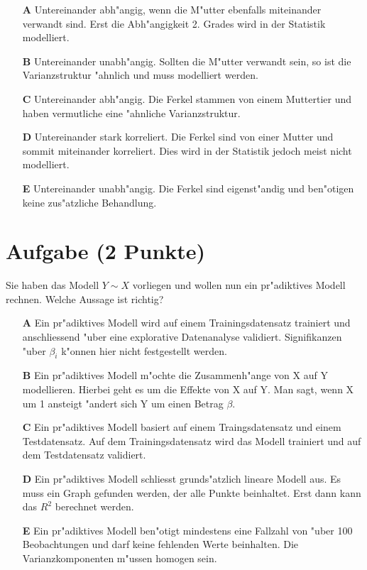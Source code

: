 \documentclass[a4paper, 10pt]{scrartcl}\usepackage[]{graphicx}\usepackage[]{xcolor}
\begin{document}
\begin{enumerate}
\item [\textbf{A} \msquare] Untereinander abh{"a}ngig, wenn die M{"u}tter ebenfalls miteinander verwandt sind. Erst die Abh{"a}ngigkeit 2. Grades wird in der Statistik modelliert.
\item [\textbf{B} \msquare] Untereinander unabh{"a}ngig. Sollten die M{"u}tter verwandt sein, so ist die Varianzstruktur {"a}hnlich und muss modelliert werden.
\item [\textbf{C} \msquare] Untereinander abh{"a}ngig. Die Ferkel stammen von einem Muttertier und haben vermutliche eine {"a}hnliche Varianzstruktur.
\item [\textbf{D} \msquare] Untereinander stark korreliert. Die Ferkel sind von einer Mutter und sommit miteinander korreliert. Dies wird in der Statistik jedoch meist nicht modelliert.
\item [\textbf{E} \msquare] Untereinander unabh{"a}ngig. Die Ferkel sind eigenst{"a}ndig und ben{"o}tigen keine zus{"a}tzliche Behandlung.
\end{enumerate}

\section{Aufgabe \hfill (2 Punkte)}




Sie haben das Modell $Y \sim X$ vorliegen und wollen nun ein
pr{"a}diktives Modell rechnen. Welche Aussage ist richtig?



\begin{enumerate}
\item [\textbf{A} \msquare] Ein pr{"a}diktives Modell wird auf einem Trainingsdatensatz trainiert und anschliessend {"u}ber eine explorative Datenanalyse validiert. Signifikanzen {"u}ber $\beta_i$ k{"o}nnen hier nicht festgestellt werden.
\item [\textbf{B} \msquare] Ein pr{"a}diktives Modell m{"o}chte die Zusammenh{"a}nge von X auf Y modellieren. Hierbei geht es um die Effekte von X auf Y. Man sagt, wenn X um 1 ansteigt {"a}ndert sich Y um einen Betrag $\beta$.
\item [\textbf{C} \msquare] Ein pr{"a}diktives Modell basiert auf einem Traingsdatensatz und einem Testdatensatz. Auf dem Trainingsdatensatz wird das Modell trainiert und auf dem Testdatensatz validiert.
\item [\textbf{D} \msquare] Ein pr{"a}diktives Modell schliesst grunds{"a}tzlich lineare Modell aus. Es muss ein Graph gefunden werden, der alle Punkte beinhaltet. Erst dann kann das $R^2$ berechnet werden.
\item [\textbf{E} \msquare] Ein pr{"a}diktives Modell ben{"o}tigt mindestens eine Fallzahl von {"u}ber 100 Beobachtungen und darf keine fehlenden Werte beinhalten. Die Varianzkomponenten m{"u}ssen homogen sein.
\end{enumerate}
\end{document}
